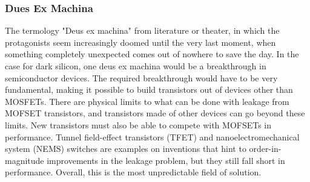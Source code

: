 \subsubsection{Dues Ex Machina}
The termology "Deus ex machina" from literature or theater, in which the protagonists seem increasingly doomed until the very last moment, when something completely unexpected comes out of nowhere to save the day.
In the case for dark silicon, one deus ex machina would be a breakthrough in semiconductor devices.
The required breakthrough would have to be very fundamental, making it possible to build transistors out of devices other than MOSFETs. 
There are physical limits to what can be done with leakage from MOFSET transistors, and transistors made of other devices can go beyond these limits.
New transistors must also be able to compete with MOFSETs in performance.
Tunnel field-effect transistors (TFET) and nanoelectromechanical system (NEMS) switches are examples on inventions that hint to order-in-magnitude improvements in the leakage problem, but they still fall short in performance.
Overall, this is the most unpredictable field of solution. \cite{dark-silicon}





